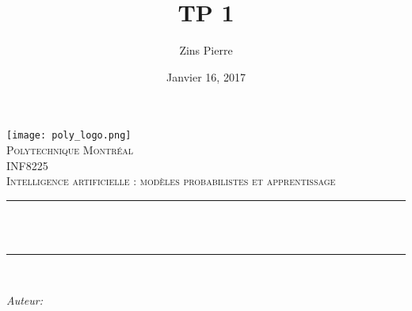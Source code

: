 \documentclass[12pt]{article}
\title{TP 1}								%
\author{Zins Pierre}						%
\date{Janvier 16, 2017}							%
\makeatletter
\let\thetitle\@title
\let\theauthor\@author
\let\thedate\@date
\makeatother
\begin{document}

\begin{titlepage}
	\centering
    \vspace*{0.5 cm}
    \texttt{[image: poly\_logo.png]}\\[1.0 cm]	%
    \textsc{\LARGE Polytechnique Montréal}\\[2.0 cm]	%
	\textsc{\Large INF8225 }\\[0.5 cm]				%
	\textsc{Intelligence artificielle : modèles probabilistes et apprentissage}\\[0.5 cm]				%
	\rule{\linewidth}{0.2 mm} \\[0.4 cm]
	{ \huge \bfseries \thetitle}\\
	\rule{\linewidth}{0.2 mm} \\[1.5 cm]
	
	\begin{minipage}{0.4\textwidth}
		\begin{flushleft} \large
			\emph{Auteur:}\\
			\theauthor
			\end{flushleft}
			\end{minipage}~
			\begin{minipage}{0.4\textwidth}
			\begin{flushright} \large
		\end{flushright}
	\end{minipage}\\[2 cm]
	
	{\large \thedate}\\[2 cm]
 
	\vfill
	
\end{titlepage}


\tableofcontents
\pagebreak


\end{document}
